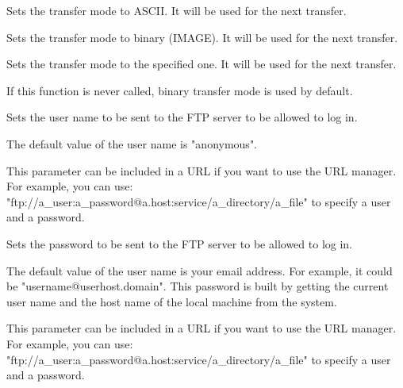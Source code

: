 Sets the transfer mode to ASCII. It will be used for the next transfer.



Sets the transfer mode to binary (IMAGE). It will be used for the next transfer.



Sets the transfer mode to the specified one. It will be used for the next
transfer.

If this function is never called, binary transfer mode is used by default.




Sets the user name to be sent to the FTP server to be allowed to log in.


The default value of the user name is "anonymous".


This parameter can be included in a URL if you want to use the URL manager.
For example, you can use: "ftp://a\_user:a\_password@a.host:service/a\_directory/a\_file"
to specify a user and a password.



Sets the password to be sent to the FTP server to be allowed to log in.


The default value of the user name is your email address. For example, it could
be "username@userhost.domain". This password is built by getting the current
user name and the host name of the local machine from the system.


This parameter can be included in a URL if you want to use the URL manager.
For example, you can use: "ftp://a\_user:a\_password@a.host:service/a\_directory/a\_file"
to specify a user and a password.


